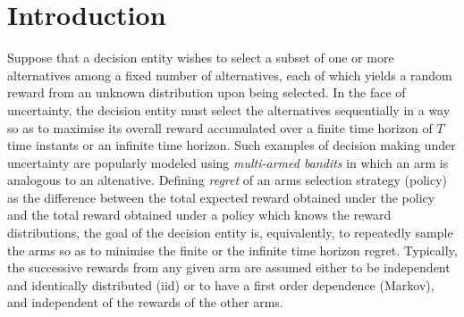 \chapter{Introduction}
\label{ch:introduction}

%

Suppose that a decision entity wishes to select a subset of one or more alternatives among a fixed number of alternatives, each of which yields a random reward from an unknown distribution upon being selected. In the face of uncertainty, the decision entity must select the alternatives sequentially in a way so as to maximise its overall reward accumulated over a finite time horizon of $T$ time instants or an infinite time horizon. Such examples of decision making under uncertainty are popularly modeled using {\em multi-armed bandits} in which an arm is analogous to an altenative. Defining {\em regret} of an arms selection strategy (policy) as the difference between the total expected reward obtained under the policy and the total reward obtained under a policy which knows the reward distributions, the goal of the decision entity is, equivalently, to repeatedly sample the arms so as to minimise the finite or the infinite time horizon regret. Typically, the successive rewards from any given arm are assumed either to be independent and identically distributed (iid) or to have a first order dependence (Markov), and independent of the rewards of the other arms.


